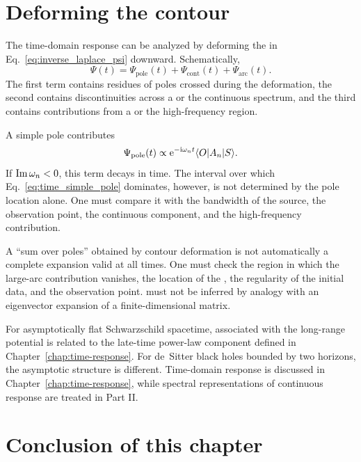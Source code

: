 \section{Deforming the contour}

The time-domain response can be analyzed by deforming the  in Eq.~\eqref{eq:inverse_laplace_psi} downward. Schematically,
\begin{equation}
\Psi(t)
=
\Psi_{\mathrm{pole}}(t)
+\Psi_{\mathrm{cont}}(t)
+\Psi_{\mathrm{arc}}(t).
\label{eq:response_decomposition}
\end{equation}
The first term contains residues of poles crossed during the deformation, the second contains discontinuities across a  or the continuous spectrum, and the third contains contributions from a  or the high-frequency region.

A simple pole contributes
\begin{equation}
\Psi_{\mathrm{pole}}(t)
\mathrel{\propto}
\mathrm{e}^{-\mathrm{i}\omega_n t}
\langle O \rvert A_n\lvert S \rangle.
\label{eq:time_simple_pole}
\end{equation}
If $\operatorname{Im}\omega_n<0$, this term decays in time. The interval over which Eq.~\eqref{eq:time_simple_pole} dominates, however, is not determined by the pole location alone. One must compare it with the bandwidth of the source, the observation point, the continuous component, and the high-frequency contribution.

\begin{warningbox}
A ``sum over poles'' obtained by contour deformation is not automatically a complete expansion valid at all times. One must check the region in which the large-arc contribution vanishes, the location of the , the regularity of the initial data, and the observation point.  must not be inferred by analogy with an eigenvector expansion of a finite-dimensional matrix.
\end{warningbox}

For asymptotically flat Schwarzschild spacetime,  associated with the long-range potential is related to the late-time power-law component defined in Chapter~\ref{chap:time-response}. For de~Sitter black holes bounded by two horizons, the asymptotic structure is different. Time-domain response is discussed in Chapter~\ref{chap:time-response}, while spectral representations of continuous response are treated in Part II.

\section{Conclusion of this chapter}

